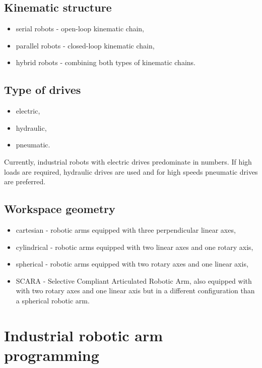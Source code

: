 \subsection*{Kinematic structure}

\begin{itemize}
    \item serial robots - open-loop kinematic chain,
    \item parallel robots - closed-loop kinematic chain,
    \item hybrid robots - combining both types of kinematic chains.
\end{itemize}


\subsection*{Type of drives}

\begin{itemize}
    \item electric,
    \item hydraulic,
    \item pneumatic.
\end{itemize}

Currently, industrial robots with electric drives predominate in numbers. If high loads are required, hydraulic drives are used and for high speeds pneumatic drives are preferred.

\subsection*{Workspace geometry}

\begin{itemize}
    \item cartesian - robotic arms equipped with three perpendicular linear axes,
    \item cylindrical - robotic arms equipped with two linear axes and one rotary axis,
    \item spherical -  robotic arms equipped with two rotary axes and one linear axis,
    \item SCARA - Selective Compliant Articulated Robotic Arm, also equipped with with two rotary axes and one linear axis but in a different configuration than a spherical robotic arm.
\end{itemize}

\section{Industrial robotic arm programming}


